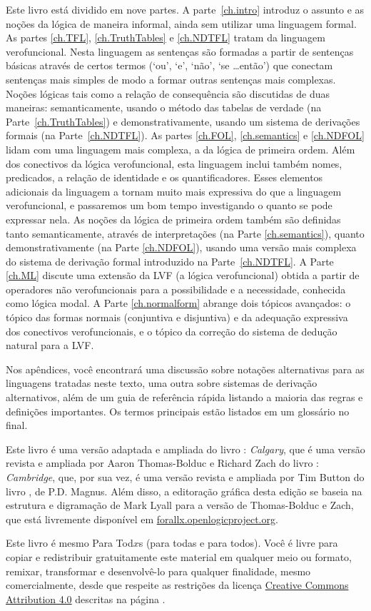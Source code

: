 Este livro está dividido em nove partes.
A parte~\ref{ch.intro} introduz o assunto e as noções da lógica de maneira informal, ainda sem utilizar uma linguagem formal.
As partes \ref{ch.TFL}, \ref{ch.TruthTables} e \ref{ch.NDTFL} tratam da linguagem verofuncional.  Nesta linguagem as sentenças são formadas a partir de sentenças básicas através de certos termos (`ou', `e', `não', `se \dots então') que conectam sentenças mais simples de modo a formar outras sentenças mais complexas.
Noções lógicas tais como a relação de consequência são discutidas de duas maneiras:
semanticamente, usando o método das tabelas de verdade (na Parte~\ref{ch.TruthTables}) e demonstrativamente, usando um sistema de derivações formais (na Parte~\ref{ch.NDTFL}).
As partes \ref{ch.FOL}, \ref{ch.semantics} e \ref{ch.NDFOL} lidam com uma linguagem mais complexa, a da lógica de primeira ordem.
Além dos conectivos da lógica verofuncional, esta linguagem inclui também nomes, predicados, a relação de identidade e os quantificadores.
Esses elementos adicionais da linguagem a tornam muito mais expressiva do que a linguagem verofuncional, e passaremos um bom tempo investigando o quanto se pode expressar nela.
As noções da lógica de primeira ordem também são definidas tanto semanticamente, através de interpretações (na Parte \ref{ch.semantics}), quanto demonstrativamente (na Parte \ref{ch.NDFOL}), usando uma versão mais complexa do sistema de derivação formal introduzido na Parte~\ref{ch.NDTFL}.
A Parte \ref{ch.ML} discute uma extensão da LVF (a lógica verofuncional) obtida a partir de operadores não verofuncionais para a possibilidade e a necessidade, conhecida como lógica modal.
A Parte \ref{ch.normalform} abrange dois tópicos avançados:
o tópico das formas normais (conjuntiva e disjuntiva) e da adequação expressiva dos conectivos verofuncionais, e o tópico da correção do sistema de dedução natural para a LVF.

Nos apêndices, você encontrará uma discussão sobre notações alternativas para as linguagens tratadas neste texto, uma outra sobre sistemas de derivação alternativos, além  de um guia de referência rápida listando a maioria das regras e definições importantes.
Os termos principais estão listados em um glossário no final.

Este livro  é uma versão adaptada e ampliada do livro \forallx: \emph{Calgary}, que é uma versão revista e ampliada por Aaron Thomas-Bolduc e Richard Zach do livro \forallx: \emph{Cambridge}, que, por sua vez, é uma versão revista e ampliada por Tim Button do livro \forallx, de P.D. Magnus.
Além disso, a editoração gráfica desta edição se baseia na estrutura e digramação de Mark Lyall para a versão de Thomas-Bolduc e Zach, que está livremente disponível em \hbox{\href{https://forallx.openlogicproject.org}{forallx.openlogicproject.org}}.

Este livro é mesmo Para Tod$x$s (para todas e para todos).
Você é livre para copiar e redistribuir gratuitamente este material em qualquer meio ou formato, remixar, transformar e desenvolvê-lo para qualquer finalidade, mesmo comercialmente, desde que respeite as restrições da licença  \href{https://creativecommons.org/licenses/by/4.0/}{Creative Commons Attribution 4.0} descritas na página \pageref{cc4by}.


